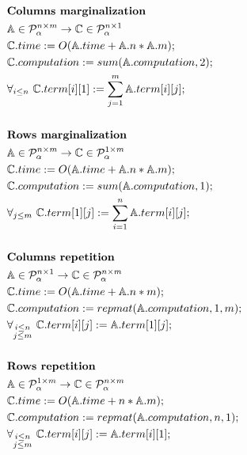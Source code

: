 \begin{figure}\label{rules}
\begin{framed}
\begin{align*}
&\text{{\bf Columns marginalization}}\\
&\mathbb{A} \in \mathcal{P}^{n \times m}_\alpha \rightarrow \mathbb{C} \in \mathcal{P}^{n \times 1}_\alpha \\
&\mathbb{C}.time := O(\mathbb{A}.time + \mathbb{A}.n * \mathbb{A}.m);\\
&\mathbb{C}.computation := sum(\mathbb{A}.computation, 2); \\
&\forall_{i \leq n}\text{ }\mathbb{C}.term[i][1] := \sum_{j = 1}^m \mathbb{A}.term[i][j];\\
& \\
&\text{{\bf Rows marginalization}}\\
&\mathbb{A} \in \mathcal{P}^{n \times m}_\alpha \rightarrow \mathbb{C} \in \mathcal{P}^{1 \times m}_\alpha \\
&\mathbb{C}.time := O(\mathbb{A}.time + \mathbb{A}.n * \mathbb{A}.m);\\
&\mathbb{C}.computation := sum(\mathbb{A}.computation, 1); \\
&\forall_{j \leq m}\text{ }\mathbb{C}.term[1][j] := \sum_{i = 1}^n \mathbb{A}.term[i][j];\\
& \\
&\text{{\bf Columns repetition}}\\
&\mathbb{A} \in \mathcal{P}^{n \times 1}_\alpha \rightarrow \mathbb{C} \in \mathcal{P}^{n \times m}_\alpha \\
&\mathbb{C}.time := O(\mathbb{A}.time + \mathbb{A}.n * m);\\
&\mathbb{C}.computation := repmat(\mathbb{A}.computation, 1, m); \\
&\forall_{\substack{i \leq n\\ j \leq  m}}\text{ } \mathbb{C}.term[i][j] := \mathbb{A}.term[1][j];\\
& \\
&\text{{\bf Rows repetition}}\\
&\mathbb{A} \in \mathcal{P}^{1 \times m}_\alpha \rightarrow \mathbb{C} \in \mathcal{P}^{n \times m}_\alpha \\
&\mathbb{C}.time := O(\mathbb{A}.time + n * \mathbb{A}.m);\\
&\mathbb{C}.computation := repmat(\mathbb{A}.computation, n, 1); \\
&\forall_{\substack{i \leq n\\j \leq m}}\text{ } \mathbb{C}.term[i][j] := \mathbb{A}.term[i][1];\\

\end{align*}
\end{framed}
\end{figure}
